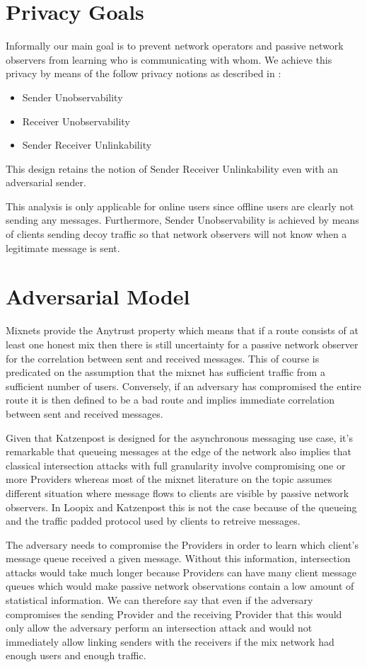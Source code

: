 \documentclass[conference]{IEEEtran}
\begin{document}
\section{Privacy Goals}
Informally our main goal is to prevent network operators and passive network observers
from learning who is communicating with whom. We achieve this privacy by means of the
follow privacy notions as described in \cite{notions-pets2019}:
\begin{itemize}
\item Sender Unobservability
\item Receiver Unobservability
\item Sender Receiver Unlinkability
\end{itemize}
This design retains the notion of Sender Receiver Unlinkability even
with an adversarial sender.

This analysis is only applicable for online users since offline users are
clearly not sending any messages. Furthermore, Sender Unobservability is achieved
by means of clients sending decoy traffic so that network observers will not know
when a legitimate message is sent.

\section{Adversarial Model}
Mixnets provide the Anytrust property which means that if a route
consists of at least one honest mix then there is still uncertainty
for a passive network observer for the correlation between sent and
received messages. This of course is predicated on the assumption that
the mixnet has sufficient traffic from a sufficient number of users.
Conversely, if an adversary has compromised the entire route it is then
defined to be a bad route and implies immediate correlation between sent
and received messages.

Given that Katzenpost is designed for the asynchronous messaging use
case, it's remarkable that queueing messages at the edge of the
network also implies that classical intersection attacks with full
granularity involve compromising one or more Providers whereas most of
the mixnet literature on the topic assumes different situation where
message flows to clients are visible by passive network observers. In
Loopix and Katzenpost this is not the case because of the queueing and
the traffic padded protocol used by clients to retreive messages.

The adversary needs to compromise the Providers in order to learn
which client's message queue received a given message. Without this
information, intersection attacks would take much longer because
Providers can have many client message queues which would make passive
network observations contain a low amount of statistical
information. We can therefore say that even if the adversary
compromises the sending Provider and the receiving Provider that this
would only allow the adversary perform an intersection attack and
would not immediately allow linking senders with the receivers if the
mix network had enough users and enough traffic.
\end{document}
